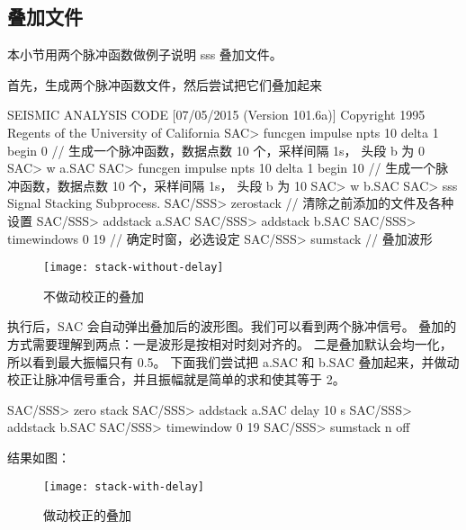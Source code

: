 \subsection{叠加文件}

本小节用两个脉冲函数做例子说明 sss 叠加文件。

首先，生成两个脉冲函数文件，然后尝试把它们叠加起来

\begin{SACCode}
SEISMIC ANALYSIS CODE [07/05/2015 (Version 101.6a)]
Copyright 1995 Regents of the University of California
SAC> funcgen impulse npts 10 delta 1 begin 0
// 生成一个脉冲函数，数据点数 10 个，采样间隔 1s， 头段 b 为 0
SAC> w a.SAC
SAC> funcgen impulse npts 10 delta 1 begin 10
// 生成一个脉冲函数，数据点数 10 个，采样间隔 1s， 头段 b 为 10
SAC> w b.SAC
SAC> sss
 Signal Stacking Subprocess.
SAC/SSS> zerostack         // 清除之前添加的文件及各种设置
SAC/SSS> addstack a.SAC
SAC/SSS> addstack b.SAC
SAC/SSS> timewindows 0 19    // 确定时窗，必选设定
SAC/SSS> sumstack    // 叠加波形
\end{SACCode}

\begin{figure}[H]
\centering
\texttt{[image: stack-without-delay]}
\caption{不做动校正的叠加}
\label{fig:filter-waveform}
\end{figure}

执行后，SAC 会自动弹出叠加后的波形图。我们可以看到两个脉冲信号。
叠加的方式需要理解到两点：一是波形是按相对时刻对齐的。
二是叠加默认会均一化，所以看到最大振幅只有 0.5。
下面我们尝试把 a.SAC 和 b.SAC 叠加起来，并做动校正让脉冲信号重合，并且振幅就是简单的求和使其等于 2。

\begin{SACCode}
SAC/SSS> zero stack
SAC/SSS> addstack a.SAC delay 10 s
SAC/SSS> addstack b.SAC
SAC/SSS> timewindow 0 19
SAC/SSS> sumstack n off
\end{SACCode}

结果如图：

\begin{figure}[H]
\centering
\texttt{[image: stack-with-delay]}
\caption{做动校正的叠加}
\label{fig:filter-waveform}
\end{figure}
